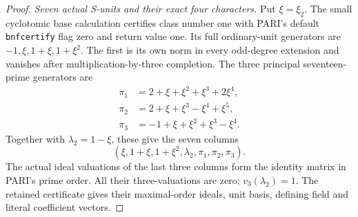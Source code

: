 \begin{proof}
\emph{Seven actual S-units and their exact four characters.}
Put $\xi=\xi_2$. The small cyclotomic base calculation
certifies class number one with PARI's default
\texttt{bnfcertify} flag zero and return value one.
Its full ordinary-unit generators are
$-1,\xi,1+\xi,1+\xi^2$. The first is its own norm
in every odd-degree extension and vanishes after
multiplication-by-three completion.
The three principal seventeen-prime generators are
\[
 \begin{split}
 \pi_1&=2+\xi+\xi^2+\xi^3+2\xi^4,\\
 \pi_2&=2+\xi+\xi^3-\xi^4+\xi^5,\\
 \pi_3&=-1+\xi+\xi^2+\xi^3-\xi^4.
 \end{split}
 \tag{E111.14}
\]
Together with $\lambda_2=1-\xi$, these give the seven
columns
\[
             (\xi,1+\xi,1+\xi^2,\lambda_2,
                                      \pi_1,\pi_2,\pi_3).
 \tag{E111.15}
\]
The actual ideal valuations of the last three columns form
the identity matrix in PARI's prime order. All their
three-valuations are zero; $v_3(\lambda_2)=1$.
The retained certificate gives their maximal-order ideals,
unit basis, defining field and literal coefficient vectors.


\end{proof}
